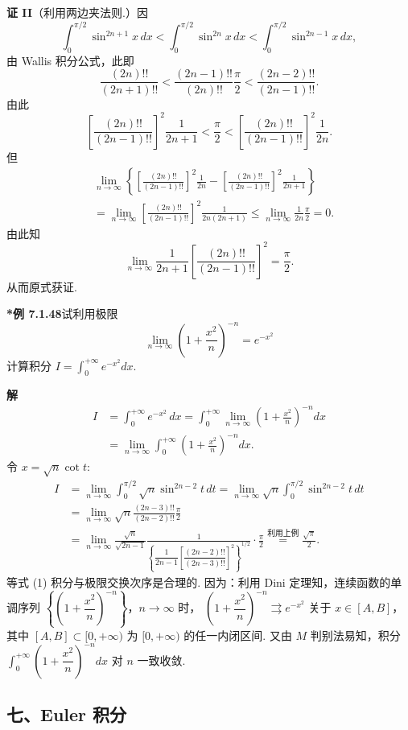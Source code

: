 \documentclass[UTF8, 12pt, fontset=fandol, oneside]{ctexart}
\begin{document}
\noindent\textbf{证 II}\quad （利用两边夹法则.）因
\[
\int_0^{\pi/2}\sin^{2n+1}x\,dx<
\int_0^{\pi/2}\sin^{2n}x\,dx<
\int_0^{\pi/2}\sin^{2n-1}x\,dx,
\]
由 Wallis 积分公式，此即
\[
\frac{(2n)!!}{(2n+1)!!}<
\frac{(2n-1)!!}{(2n)!!}\frac\pi2<
\frac{(2n-2)!!}{(2n-1)!!}.
\]
由此
\[
\left[\frac{(2n)!!}{(2n-1)!!}\right]^2\frac1{2n+1}
<\frac\pi2<
\left[\frac{(2n)!!}{(2n-1)!!}\right]^2\frac1{2n}.
\tag{1}
\]
但
\[
\begin{aligned}
&\lim_{n\to\infty}\left\{
\left[\frac{(2n)!!}{(2n-1)!!}\right]^2\frac1{2n}
-\left[\frac{(2n)!!}{(2n-1)!!}\right]^2\frac1{2n+1}\right\}\\
&=\lim_{n\to\infty}\left[\frac{(2n)!!}{(2n-1)!!}\right]^2\frac1{2n(2n+1)}
\le\lim_{n\to\infty}\frac1{2n}\frac\pi2=0.
\end{aligned}
\]
由此知
\[
\lim_{n\to\infty}\frac1{2n+1}\left[\frac{(2n)!!}{(2n-1)!!}\right]^2=\frac\pi2.
\]
从而原式获证.

\noindent\textbf{*例 7.1.48}\quad 试利用极限
\[
\lim_{n\to\infty}\left(1+\frac{x^2}{n}\right)^{-n}=e^{-x^2}
\]
计算积分 $I=\displaystyle\int_0^{+\infty}e^{-x^2}dx$.

\noindent\textbf{解}\quad
\[
\begin{aligned}
I&=\int_0^{+\infty}e^{-x^2}\,dx
=\int_0^{+\infty}\lim_{n\to\infty}\left(1+\frac{x^2}{n}\right)^{-n}dx\\
&=\lim_{n\to\infty}\int_0^{+\infty}\left(1+\frac{x^2}{n}\right)^{-n}dx.
\end{aligned}
\tag{1}
\]
令 $x=\sqrt n\cot t$:
\[
\begin{aligned}
I&=\lim_{n\to\infty}\int_0^{\pi/2}\sqrt n\sin^{2n-2}t\,dt
=\lim_{n\to\infty}\sqrt n\int_0^{\pi/2}\sin^{2n-2}t\,dt\\
&=\lim_{n\to\infty}\sqrt n\frac{(2n-3)!!}{(2n-2)!!}\frac\pi2\\
&=\lim_{n\to\infty}\frac{\sqrt n}{\sqrt{2n-1}}
\frac{1}{\left\{\dfrac1{2n-1}\left[\dfrac{(2n-2)!!}{(2n-3)!!}\right]^2\right\}^{1/2}}\cdot\frac\pi2
\overset{\text{利用上例}}{=}\frac{\sqrt\pi}{2}.
\end{aligned}
\]
等式 (1) 积分与极限交换次序是合理的. 因为：利用 Dini 定理知，连续函数的单调序列
$\left\{\left(1+\dfrac{x^2}{n}\right)^{-n}\right\}$，$n\to\infty$ 时，
$\left(1+\dfrac{x^2}{n}\right)^{-n}\rightrightarrows e^{-x^2}$ 关于 $x\in[A,B]$，其中 $[A,B]\subset[0,+\infty)$ 为 $[0,+\infty)$ 的任一内闭区间. 又由 $M$ 判别法易知，积分 $\displaystyle\int_0^{+\infty}\left(1+\dfrac{x^2}{n}\right)^{-n}dx$ 对 $n$ 一致收敛.

\subsection*{七、Euler 积分}
\end{document}
